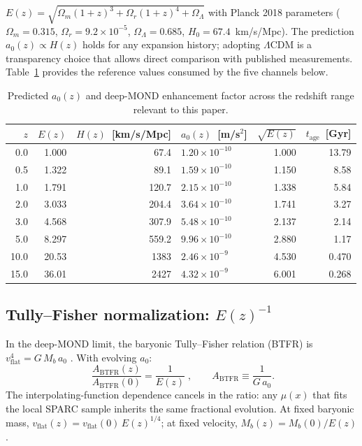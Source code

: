 \documentclass[11pt,a4paper]{article}
\numberwithin{equation}{section}
\numberwithin{table}{section}
\numberwithin{figure}{section}
\newcommand{\afid}{a_0}
\newcommand{\vflat}{v_\text{flat}}
\newcommand{\Mb}{M_b}
\newcommand{\Hz}{H(z)}
\newcommand{\Ez}{E(z)}
\begin{document}
$\Ez = \sqrt{\Omega_m(1+z)^3 + \Omega_r(1+z)^4 + \Omega_\Lambda}$
with Planck 2018 parameters \citep{Planck2018}
($\Omega_m = 0.315$, $\Omega_r = 9.2 \times 10^{-5}$,
$\Omega_\Lambda = 0.685$, $H_0 = 67.4$~km/s/Mpc). The prediction
$\afid(z) \propto H(z)$ holds for any expansion history; adopting
$\Lambda$CDM is a transparency choice that allows direct comparison
with published measurements. Table~\ref{tab:cosmology} provides the
reference values consumed by the five channels below.

\begin{table}[!ht]
\centering
\caption{Predicted $\afid(z)$ and deep-MOND enhancement factor across
the redshift range relevant to this paper.}
\label{tab:cosmology}
\begin{tabular}{r r r l r r}
\toprule
$z$ & $\Ez$ & $\Hz$~[km/s/Mpc] & $\afid(z)$~[m/s$^2$] & $\sqrt{\Ez}$ & $t_\text{age}$~[Gyr] \\
\midrule
0.0  & 1.000  & 67.4   & $1.20 \times 10^{-10}$ & 1.000 & 13.79 \\
0.5  & 1.322  & 89.1   & $1.59 \times 10^{-10}$ & 1.150 & 8.58  \\
1.0  & 1.791  & 120.7  & $2.15 \times 10^{-10}$ & 1.338 & 5.84  \\
2.0  & 3.033  & 204.4  & $3.64 \times 10^{-10}$ & 1.741 & 3.27  \\
3.0  & 4.568  & 307.9  & $5.48 \times 10^{-10}$ & 2.137 & 2.14  \\
5.0  & 8.297  & 559.2  & $9.96 \times 10^{-10}$ & 2.880 & 1.17  \\
10.0 & 20.53  & 1383   & $2.46 \times 10^{-9}$  & 4.530 & 0.470 \\
15.0 & 36.01  & 2427   & $4.32 \times 10^{-9}$  & 6.001 & 0.268 \\
\bottomrule
\end{tabular}
\end{table}

\subsection{Tully--Fisher normalization: $\Ez^{-1}$}
\label{sec:btfr}

In the deep-MOND limit, the baryonic Tully--Fisher relation (BTFR) is
$\vflat^4 = G\,\Mb\,\afid$ \citep{Lelli2016}. With evolving $\afid$:
\begin{equation}
\boxed{\;\frac{A_\text{BTFR}(z)}{A_\text{BTFR}(0)} = \frac{1}{\Ez}\;},
\qquad A_\text{BTFR} \equiv \frac{1}{G\,\afid}.
\label{eq:btfr}
\end{equation}
The interpolating-function dependence cancels in the ratio: any $\mu(x)$
that fits the local SPARC sample inherits the same fractional
evolution. At fixed baryonic mass, $\vflat(z) = \vflat(0)\,\Ez^{1/4}$;
at fixed velocity, $\Mb(z) = \Mb(0)/\Ez$.
\end{document}
